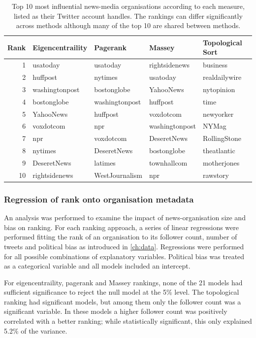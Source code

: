 \begin{table}[!htbp]
\centering
\begin{tabular}{rlllll}
\toprule
Rank &  Eigencentraility & Pagerank &  Massey & Topological Sort \\
\midrule
1  &        usatoday &        usatoday &   rightsidenews &       business \\
2  &        huffpost &         nytimes &        usatoday &  realdailywire \\
3  &  washingtonpost &     bostonglobe &       YahooNews &     nytopinion \\
4  &     bostonglobe &  washingtonpost &        huffpost &           time \\
5  &       YahooNews &        huffpost &       voxdotcom &      newyorker \\
6  &       voxdotcom &             npr &  washingtonpost &          NYMag \\
7  &             npr &       voxdotcom &     DeseretNews &   RollingStone \\
8  &         nytimes &     DeseretNews &     bostonglobe &    theatlantic \\
9  &     DeseretNews &         latimes &     townhallcom &    motherjones \\
10 &   rightsidenews &  WestJournalism &             npr &       rawstory \\
\bottomrule
\end{tabular}
\caption{Top 10 most influential news-media organisations according to each measure, listed as their Twitter account handles. The rankings can differ significantly across methods although many of the top 10 are shared between methods.}\label{tab:ranking_top10}
\end{table}

\subsubsection{Regression of rank onto organisation metadata}
An analysis was performed to examine the impact of news-organisation size and bias on ranking. For each ranking approach, a series of linear regressions were performed fitting the rank of an organisation to its follower count, number of tweets and political bias as introduced in \autoref{ch:data}. Regressions were performed for all possible combinations of explanatory variables. Political bias was treated as a categorical variable and all models included an intercept. 

For eigencentraility, pagerank and Massey rankings, none of the 21 models had sufficient significance to reject the null model at the 5\% level. The topological ranking had significant models, but among them only the follower count was a significant variable. In these models a higher follower count was positively correlated with a better ranking; while statistically significant, this only explained 5.2\% of the variance.



